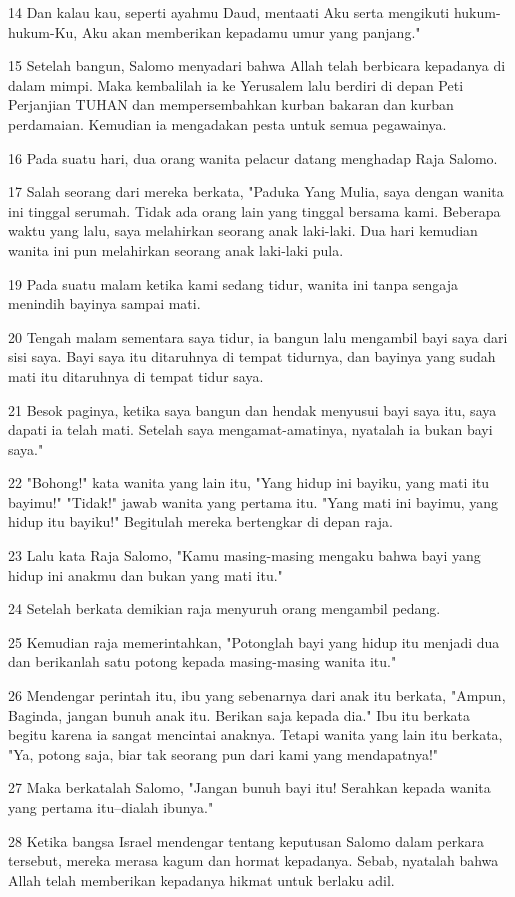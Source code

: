 \par 14 Dan kalau kau, seperti ayahmu Daud, mentaati Aku serta mengikuti hukum-hukum-Ku, Aku akan memberikan kepadamu umur yang panjang."
\par 15 Setelah bangun, Salomo menyadari bahwa Allah telah berbicara kepadanya di dalam mimpi. Maka kembalilah ia ke Yerusalem lalu berdiri di depan Peti Perjanjian TUHAN dan mempersembahkan kurban bakaran dan kurban perdamaian. Kemudian ia mengadakan pesta untuk semua pegawainya.
\par 16 Pada suatu hari, dua orang wanita pelacur datang menghadap Raja Salomo.
\par 17 Salah seorang dari mereka berkata, "Paduka Yang Mulia, saya dengan wanita ini tinggal serumah. Tidak ada orang lain yang tinggal bersama kami. Beberapa waktu yang lalu, saya melahirkan seorang anak laki-laki. Dua hari kemudian wanita ini pun melahirkan seorang anak laki-laki pula.
\par 19 Pada suatu malam ketika kami sedang tidur, wanita ini tanpa sengaja menindih bayinya sampai mati.
\par 20 Tengah malam sementara saya tidur, ia bangun lalu mengambil bayi saya dari sisi saya. Bayi saya itu ditaruhnya di tempat tidurnya, dan bayinya yang sudah mati itu ditaruhnya di tempat tidur saya.
\par 21 Besok paginya, ketika saya bangun dan hendak menyusui bayi saya itu, saya dapati ia telah mati. Setelah saya mengamat-amatinya, nyatalah ia bukan bayi saya."
\par 22 "Bohong!" kata wanita yang lain itu, "Yang hidup ini bayiku, yang mati itu bayimu!" "Tidak!" jawab wanita yang pertama itu. "Yang mati ini bayimu, yang hidup itu bayiku!" Begitulah mereka bertengkar di depan raja.
\par 23 Lalu kata Raja Salomo, "Kamu masing-masing mengaku bahwa bayi yang hidup ini anakmu dan bukan yang mati itu."
\par 24 Setelah berkata demikian raja menyuruh orang mengambil pedang.
\par 25 Kemudian raja memerintahkan, "Potonglah bayi yang hidup itu menjadi dua dan berikanlah satu potong kepada masing-masing wanita itu."
\par 26 Mendengar perintah itu, ibu yang sebenarnya dari anak itu berkata, "Ampun, Baginda, jangan bunuh anak itu. Berikan saja kepada dia." Ibu itu berkata begitu karena ia sangat mencintai anaknya. Tetapi wanita yang lain itu berkata, "Ya, potong saja, biar tak seorang pun dari kami yang mendapatnya!"
\par 27 Maka berkatalah Salomo, "Jangan bunuh bayi itu! Serahkan kepada wanita yang pertama itu--dialah ibunya."
\par 28 Ketika bangsa Israel mendengar tentang keputusan Salomo dalam perkara tersebut, mereka merasa kagum dan hormat kepadanya. Sebab, nyatalah bahwa Allah telah memberikan kepadanya hikmat untuk berlaku adil.

